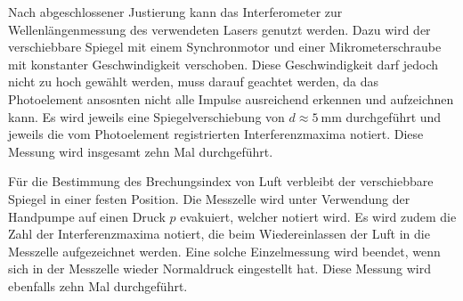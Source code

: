 Nach abgeschlossener Justierung kann das Interferometer zur Wellenlängenmessung des verwendeten Lasers genutzt werden. 
Dazu wird der verschiebbare Spiegel mit einem Synchronmotor und einer Mikrometerschraube mit konstanter Geschwindigkeit 
verschoben. Diese Geschwindigkeit darf jedoch nicht zu hoch gewählt werden, muss darauf geachtet werden, da das Photoelement 
ansosnten nicht alle Impulse ausreichend erkennen und aufzeichnen kann. Es wird jeweils eine Spiegelverschiebung von 
$d \approx \SI{5}{\milli\meter}$ durchgeführt und jeweils die vom Photoelement registrierten Interferenzmaxima notiert.
Diese Messung wird insgesamt zehn Mal durchgeführt. 

Für die Bestimmung des Brechungsindex von Luft verbleibt der verschiebbare Spiegel in einer festen Position.
Die Messzelle wird unter Verwendung der Handpumpe auf einen Druck $p$ evakuiert, welcher notiert wird. Es wird zudem die Zahl 
der Interferenzmaxima notiert, die beim Wiedereinlassen der Luft in die Messzelle aufgezeichnet werden. 
Eine solche Einzelmessung wird beendet, wenn sich in der Messzelle wieder Normaldruck eingestellt hat. 
Diese Messung wird ebenfalls zehn Mal durchgeführt. 